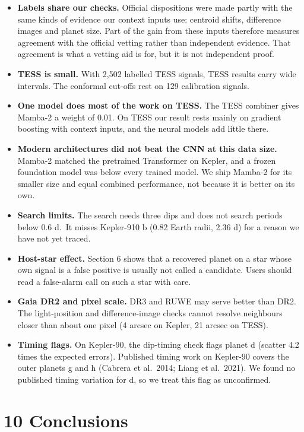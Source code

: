 \documentclass[
]{article}
\providecommand{\tightlist}{%
  \setlength{\itemsep}{0pt}\setlength{\parskip}{0pt}}
\begin{document}
\begin{itemize}
\tightlist
\item
  \textbf{Labels share our checks.} Official dispositions were made
  partly with the same kinds of evidence our context inputs use:
  centroid shifts, difference images and planet size. Part of the gain
  from these inputs therefore measures agreement with the official
  vetting rather than independent evidence. That agreement is what a
  vetting aid is for, but it is not independent proof.
\item
  \textbf{TESS is small.} With 2,502 labelled TESS signals, TESS results
  carry wide intervals. The conformal cut-offs rest on 129 calibration
  signals.
\item
  \textbf{One model does most of the work on TESS.} The TESS combiner
  gives Mamba-2 a weight of 0.01. On TESS our result rests mainly on
  gradient boosting with context inputs, and the neural models add
  little there.
\item
  \textbf{Modern architectures did not beat the CNN at this data size.}
  Mamba-2 matched the pretrained Transformer on Kepler, and a frozen
  foundation model was below every trained model. We ship Mamba-2 for
  its smaller size and equal combined performance, not because it is
  better on its own.
\item
  \textbf{Search limits.} The search needs three dips and does not
  search periods below 0.6 d.~It misses Kepler-910 b (0.82 Earth radii,
  2.36 d) for a reason we have not yet traced.
\item
  \textbf{Host-star effect.} Section 6 shows that a recovered planet on
  a star whose own signal is a false positive is usually not called a
  candidate. Users should read a false-alarm call on such a star with
  care.
\item
  \textbf{Gaia DR2 and pixel scale.} DR3 and RUWE may serve better than
  DR2. The light-position and difference-image checks cannot resolve
  neighbours closer than about one pixel (4 arcsec on Kepler, 21 arcsec
  on TESS).
\item
  \textbf{Timing flags.} On Kepler-90, the dip-timing check flags planet
  d (scatter 4.2 times the expected errors). Published timing work on
  Kepler-90 covers the outer planets g and h (Cabrera et al.~2014; Liang
  et al.~2021). We found no published timing variation for d, so we
  treat this flag as unconfirmed.
\end{itemize}

\hypertarget{conclusions}{%
\section{10 Conclusions}\label{conclusions}}
\end{document}
